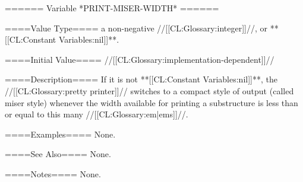 ====== Variable *PRINT-MISER-WIDTH* ======

====Value Type====
a non-negative //[[CL:Glossary:integer]]//, or **[[CL:Constant Variables:nil]]**.

====Initial Value====
//[[CL:Glossary:implementation-dependent]]//

====Description====
If it is not **[[CL:Constant Variables:nil]]**, the //[[CL:Glossary:pretty printer]]// switches to a compact style of output (called miser style) whenever the width available for printing a substructure is less than or equal to this many //[[CL:Glossary:em|ems]]//.

====Examples====
None.

====See Also====
None.

====Notes====
None.

